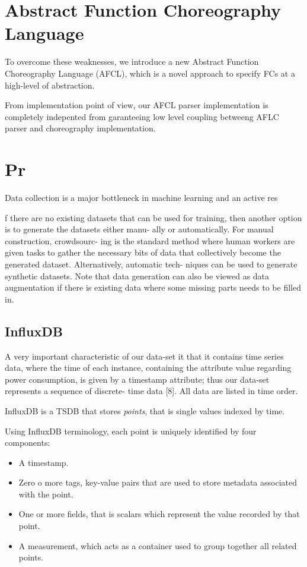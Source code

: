 \documentclass[12pt,a4paper]{report}
\begin{document}
\section{Abstract Function Choreography Language}

To overcome these weaknesses, we introduce a new Abstract
Function Choreography Language (AFCL), which is a novel approach
to specify FCs at a high-level of abstraction. 



From implementation point of view, our AFCL parser implementation is completely indepented from 
garanteeing low level coupling betweeng AFLC parser and choreography implementation.



\section{Pr}

Data collection is a major bottleneck in machine learning and an active res


f there are no existing datasets that can be used for training,
then another option is to generate the datasets either manu-
ally or automatically. For manual construction, crowdsourc-
ing is the standard method where human workers are given
tasks to gather the necessary bits of data that collectively
become the generated dataset. Alternatively, automatic tech-
niques can be used to generate synthetic datasets. Note that
data generation can also be viewed as data augmentation if
there is existing data where some missing parts needs to be
filled in.

\subsection{InfluxDB}

A very important characteristic of our data-set it that it contains time series data, where the time of each instance, containing the attribute value regarding power consumption, is given by a timestamp attribute; thus our data-set represents a sequence of discrete-
time data [8]. All data are listed in time order.


InfluxDB is a TSDB that stores \textit{points}, that is single values indexed by time. 

Using InfluxDB terminology, each point is uniquely identified by four components:

\begin{itemize}
	\item A timestamp.
	
	\item Zero o more tags, key-value pairs that are used to store metadata associated with the point. 
	 
	\item One or more fields, that is scalars which represent the value recorded by that point.
	
	\item A measurement, which acts as a container used to group together all related points.
	
\end{itemize}
\end{document}
